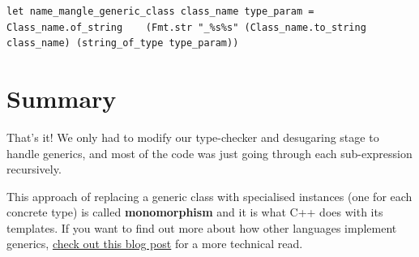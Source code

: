 %

\begin{lstlisting}[language=caml,caption={name\_mangle\_generics.ml}]
let name_mangle_generic_class class_name type_param =  Class_name.of_string    (Fmt.str "_%s%s" (Class_name.to_string class_name) (string_of_type type_param))
\end{lstlisting}

\hypertarget{summary}{%
\section{\texorpdfstring{\protect\hyperlink{summary}{}Summary}{Summary}}\label{summary}}

That's it! We only had to modify our type-checker and desugaring stage
to handle generics, and most of the code was just going through each
sub-expression recursively.

This approach of replacing a generic class with specialised instances
(one for each concrete type) is called \textbf{monomorphism} and it is
what C++ does with its templates. If you want to find out more about how
other languages implement generics,
\href{https://www.thomasdenney.co.uk/blog/2016/11/13/comparing-the-implementation-of-generics/}{check
out this blog post} for a more technical read.

